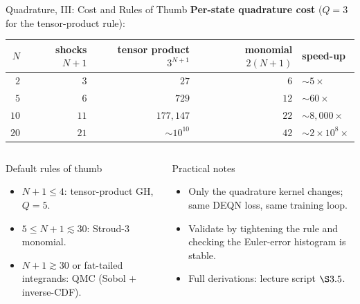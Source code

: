 \documentclass[aspectratio=169,11pt]{beamer}
\newcommand{\emphc}[1]{\textcolor{harvardcrimson}{#1}}
\begin{document}
\begin{frame}{Quadrature, III: Cost and Rules of Thumb}
\footnotesize
\textbf{Per-state quadrature cost} ($Q=3$ for the tensor-product rule):
\vspace{0.2em}
\begin{center}
\renewcommand{\arraystretch}{1.05}
\begin{tabular}{@{}rrrrl@{}}
\toprule
$N$ & shocks $N{+}1$ & tensor product $3^{N+1}$ & monomial $2(N{+}1)$ & speed-up\\
\midrule
$2$  & $3$  & $27$           & $6$   & $\sim\! 5\times$\\
$5$  & $6$  & $729$          & $12$  & $\sim\! 60\times$\\
$10$ & $11$ & $177{,}147$    & $22$  & $\sim\! 8{,}000\times$\\
$20$ & $21$ & $\sim\! 10^{10}$ & $42$  & $\sim\! 2\!\times\!10^8\times$\\
\bottomrule
\end{tabular}
\end{center}

\vspace{0.4em}
\begin{columns}[T]
\begin{block}{Default rules of thumb}
\scriptsize
\begin{itemize}\itemsep1pt
    \item $N{+}1 \le 4$: tensor-product GH, $Q\!=\!5$.
    \item $5 \le N{+}1 \lesssim 30$: Stroud-3 monomial.
    \item $N{+}1 \gtrsim 30$ or fat-tailed integrands: QMC (Sobol $+$ inverse-CDF).
\end{itemize}
\end{block}

\begin{block}{Practical notes}
\scriptsize
\begin{itemize}\itemsep1pt
    \item Only the quadrature \emphc{kernel} changes; same DEQN loss, same training loop.
    \item Validate by tightening the rule and checking the Euler-error histogram is stable.
    \item Full derivations: lecture script $\S 3.5$.
\end{itemize}
\end{block}
\end{columns}
\end{frame}
\end{document}
